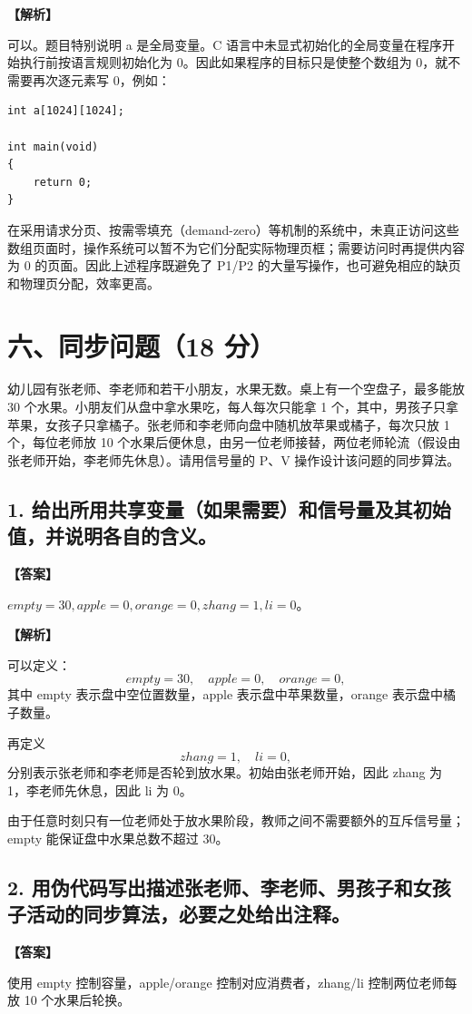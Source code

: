 \documentclass[UTF8,12pt]{ctexart}
\newenvironment{explanation}{\par\noindent\textbf{【解析】}\par\smallskip}{\par\medskip}
\newenvironment{answer}{\par\noindent\textbf{【答案】}\par\smallskip}{\par}
\begin{document}
\begin{explanation}
可以。题目特别说明 a 是全局变量。C 语言中未显式初始化的全局变量在程序开始执行前按语言规则初始化为 0。因此如果程序的目标只是使整个数组为 0，就不需要再次逐元素写 0，例如：

\begin{lstlisting}
int a[1024][1024];

int main(void)
{
    return 0;
}
\end{lstlisting}

在采用请求分页、按需零填充（demand-zero）等机制的系统中，未真正访问这些数组页面时，操作系统可以暂不为它们分配实际物理页框；需要访问时再提供内容为 0 的页面。因此上述程序既避免了 P1/P2 的大量写操作，也可避免相应的缺页和物理页分配，效率更高。
\end{explanation}
\section*{六、同步问题（18 分）}
幼儿园有张老师、李老师和若干小朋友，水果无数。桌上有一个空盘子，最多能放 30 个水果。小朋友们从盘中拿水果吃，每人每次只能拿 1 个，其中，男孩子只拿苹果，女孩子只拿橘子。张老师和李老师向盘中随机放苹果或橘子，每次只放 1 个，每位老师放 10 个水果后便休息，由另一位老师接替，两位老师轮流（假设由张老师开始，李老师先休息）。请用信号量的 P、V 操作设计该问题的同步算法。

\subsection*{1. 给出所用共享变量（如果需要）和信号量及其初始值，并说明各自的含义。}
\begin{answer}
$empty=30, apple=0, orange=0, zhang=1, li=0$。
\end{answer}

\begin{explanation}
可以定义：
\[
empty=30,\quad apple=0,\quad orange=0,
\]
其中 empty 表示盘中空位置数量，apple 表示盘中苹果数量，orange 表示盘中橘子数量。

再定义
\[
zhang=1,\quad li=0,
\]
分别表示张老师和李老师是否轮到放水果。初始由张老师开始，因此 zhang 为 1，李老师先休息，因此 li 为 0。

由于任意时刻只有一位老师处于放水果阶段，教师之间不需要额外的互斥信号量；empty 能保证盘中水果总数不超过 30。
\end{explanation}
\subsection*{2. 用伪代码写出描述张老师、李老师、男孩子和女孩子活动的同步算法，必要之处给出注释。}
\begin{answer}
使用 empty 控制容量，apple/orange 控制对应消费者，zhang/li 控制两位老师每放 10 个水果后轮换。
\end{answer}
\end{document}
